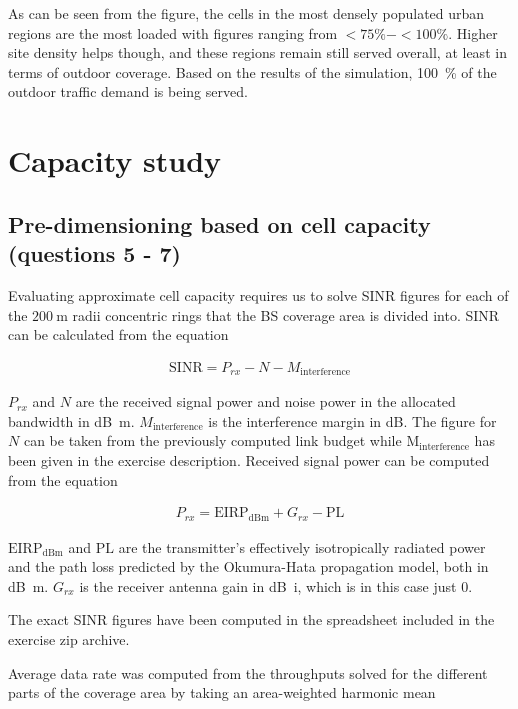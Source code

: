 \documentclass{article}
\begin{document}
As can be seen from the figure, the cells in the most densely populated urban regions are the most loaded with figures ranging from \(< 75 \% - < 100 \%\). Higher site density helps though, and these regions remain still served overall, at least in terms of outdoor coverage. Based on the results of the simulation, 100\ \% of the outdoor traffic demand is being served.

\section{Capacity study}
\subsection{Pre-dimensioning based on cell capacity (questions 5 - 7)}
Evaluating approximate cell capacity requires us to solve SINR figures for each of the \(\SI{200}{\metre}\) radii concentric rings that the BS coverage area is divided into. SINR can be calculated from the equation

\begin{gather*}
    \mathrm{SINR} = P_{rx} - N - M_{\mathrm{interference}}
\end{gather*}

\(P_{rx}\) and \(N\) are the received signal power and noise power in the allocated bandwidth in \si{\deci\bel m}. \(M_{\mathrm{interference}}\) is the interference margin in \si{\deci\bel}. The figure for \(N\) can be taken from the previously computed link budget while \(\mathrm{M_{interference}}\) has been given in the exercise description. Received signal power can be computed from the equation

\begin{gather*}
    P_{rx} = \mathrm{EIRP_{dBm}} + G_{rx} - \mathrm{PL}
\end{gather*}

\(\mathrm{EIRP_{dBm}}\) and \(\mathrm{PL}\) are the transmitter's effectively isotropically radiated power and the path loss predicted by the Okumura-Hata propagation model, both in \si{\deci\bel m}. \(G_{rx}\) is the receiver antenna gain in \si{\deci\bel i}, which is in this case just 0.

The exact SINR figures have been computed in the spreadsheet included in the exercise zip archive.

Average data rate was computed from the throughputs solved for the different parts of the coverage area by taking an area-weighted harmonic mean
\end{document}
